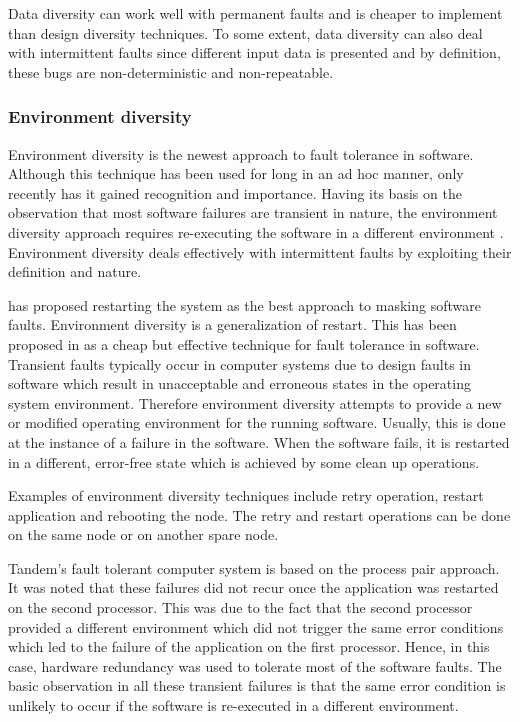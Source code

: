 \documentclass[a4paper, 11pt]{article}
\begin{document}
Data diversity can work well with permanent faults and is cheaper to implement than design diversity techniques. To some extent, data diversity can also deal with intermittent faults since different input data is presented and by definition, these bugs are non-deterministic and non-repeatable.

\subsubsection{Environment diversity}
\label{sec:envdiv}
Environment diversity is the newest approach to fault tolerance in software. Although this technique has been used for long in an ad hoc manner, only recently has it gained recognition and importance. Having its basis on the observation that most software failures are transient in nature, the environment diversity approach requires re-executing the software in a different environment \citep{jalote1995framework}. Environment diversity deals effectively with intermittent faults by exploiting their definition and nature.

\citet{adams1984optimizing} has proposed restarting the system as the best approach to masking software faults. Environment diversity is a generalization of restart. This has been proposed in \citet{huang1994two} as a cheap but effective technique for fault tolerance in software. Transient faults typically occur in computer systems due to design faults in software which result in unacceptable and erroneous states in the operating system environment. Therefore environment diversity attempts to provide a new or modified operating environment for the running software. Usually, this is done at the instance of a failure in the software. When the software fails, it is restarted in a different, error-free state which is achieved by some clean up operations.

Examples of environment diversity techniques include retry operation, restart application and rebooting the node. The retry and restart operations can be done on the same node or on another spare node.

Tandem's fault tolerant computer system \citep{lee1995software} is based on the process pair approach. It was noted that these failures did not recur once the application was restarted on the second processor. This was due to the fact that the second processor provided a different environment which did not trigger the same error conditions which led to the failure of the application on the first processor. Hence, in this case, hardware redundancy was used to tolerate most of the software faults. The basic observation in all these transient failures is that the same error condition is unlikely to occur if the software is re-executed in a different environment.
\end{document}
